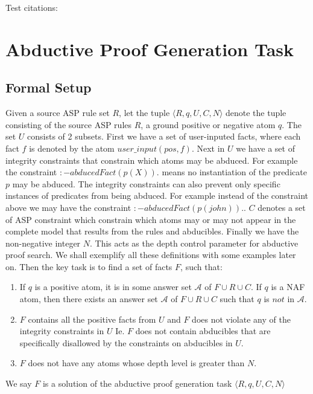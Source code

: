\documentclass[sigconf]{acmart}
\begin{document}
Test citations: \cite{lim22:_autom_defeas_reason_law,mahajan22:_overv_cclaw_l4}


\section{Abductive Proof Generation Task}\label{sec:abductive_proof}

\subsection{Formal Setup}
Given a source ASP rule set $R$, let the tuple $\langle R,q,U,C,N \rangle$ denote the tuple consisting of the source ASP rules $R$, a ground positive or negative atom $q$. The set $U$ consists of 2 subsets. First we have a set of user-inputed facts, where each fact $f$ is denoted by the atom $user\_input(pos,f)$. Next in $U$ we have a set of integrity constraints that constrain which atoms may be abduced. For example the constraint $:-abducedFact(p(X)).$ means no instantiation of the predicate $p$ may be abduced. The integrity constraints can also prevent only specific instances of predicates from being abduced. For example instead of the constraint above we may have the constraint $:-abducedFact(p(john)).$.  $C$ denotes a set of ASP constraint which constrain which atoms may or may not appear in the complete model that results from the rules and abducibles. Finally we have the non-negative integer $N$. This acts as the depth control parameter for abductive proof search. We shall exemplify all these definitions with some examples later on. Then the key task is to find a set of facts $F$, such that:

\begin{enumerate}
    \item If $q$ is a positive atom, it is in some answer set $\mathcal{A}$ of $F\cup R\cup C$. If $q$ is a NAF atom, then there exists an answer set $\mathcal{A}$ of $F\cup R\cup C$ such that $q$ is $not$ in $\mathcal{A}$.
    \item $F$ contains all the positive facts from $U$ and $F$ does not violate any of the integrity constraints in $U$ Ie. $F$ does not contain abducibles that are specifically disallowed by the constraints on abducibles in $U$.
    \item $F$ does not have any atoms whose depth level is greater than $N$.
\end{enumerate}
We say $F$ is a solution of the abductive proof generation task $\langle R,q,U,C,N \rangle$
\end{document}
